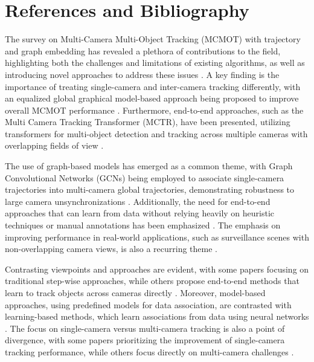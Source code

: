 \documentclass[conference]{IEEEtran}
\begin{document}
\section{References and Bibliography}
The survey on Multi-Camera Multi-Object Tracking (MCMOT) with trajectory and graph embedding has revealed a plethora of contributions to the field, highlighting both the challenges and limitations of existing algorithms, as well as introducing novel approaches to address these issues \cite{Multi-camera Multi-Object Tracking}. A key finding is the importance of treating single-camera and inter-camera tracking differently, with an equalized global graphical model-based approach being proposed to improve overall MCMOT performance \cite{An equalised global graphical model-based approach}. Furthermore, end-to-end approaches, such as the Multi Camera Tracking Transformer (MCTR), have been presented, utilizing transformers for multi-object detection and tracking across multiple cameras with overlapping fields of view \cite{MCTR: Multi Camera Tracking Transformer}.

The use of graph-based models has emerged as a common theme, with Graph Convolutional Networks (GCNs) being employed to associate single-camera trajectories into multi-camera global trajectories, demonstrating robustness to large camera unsynchronizations \cite{Graph Convolutional Network for Multi-Target Multi-Camera Vehicle Tracking}. Additionally, the need for end-to-end approaches that can learn from data without relying heavily on heuristic techniques or manual annotations has been emphasized \cite{Multi-camera Multi-Object Tracking}. The emphasis on improving performance in real-world applications, such as surveillance scenes with non-overlapping camera views, is also a recurring theme \cite{Challenge of Multi-Camera Tracking}.

Contrasting viewpoints and approaches are evident, with some papers focusing on traditional step-wise approaches, while others propose end-to-end methods that learn to track objects across cameras directly \cite{Traditional vs. End-to-End}. Moreover, model-based approaches, using predefined models for data association, are contrasted with learning-based methods, which learn associations from data using neural networks \cite{Model-based vs. Learning-based}. The focus on single-camera versus multi-camera tracking is also a point of divergence, with some papers prioritizing the improvement of single-camera tracking performance, while others focus directly on multi-camera challenges \cite{Focus on Single-Camera vs. Multi-Camera Tracking}.
\end{document}
